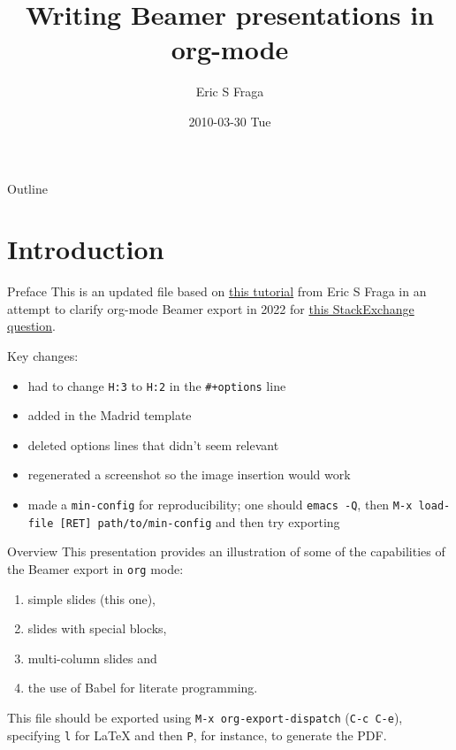 \documentclass[bigger]{beamer}
\author{Eric S Fraga}
\date{2010-03-30 Tue}
\title{Writing Beamer presentations in org-mode}
\begin{document}
\maketitle
\begin{frame}{Outline}
\tableofcontents
\end{frame}



\section{Introduction}
\label{sec:org5c56c10}
\begin{frame}[label={sec:orgdc24886},fragile]{Preface}
 This is an updated file based on \href{https://orgmode.org/worg/exporters/beamer/tutorial.html}{this tutorial} from Eric S Fraga in an attempt to clarify
org-mode Beamer export in 2022 for \href{https://stackoverflow.com/questions/6691588/emacs-org-beamer-no-definition-for-class-beamer-in-org-export-latex-class/7972859}{this StackExchange question}.

Key changes:
\begin{itemize}
\item had to change \texttt{H:3} to \texttt{H:2} in the \texttt{\#+options} line
\item added in the Madrid template
\item deleted options lines that didn't seem relevant
\item regenerated a screenshot so the image insertion would work
\item made a \texttt{min-config} for reproducibility; one should \texttt{emacs -Q}, then \texttt{M-x load-file
  [RET] path/to/min-config} and then try exporting
\end{itemize}
\end{frame}

\begin{frame}[label={sec:org9d87f98},fragile]{Overview}
 This presentation provides an illustration of some of the capabilities of the \alert{Beamer} export in \texttt{org} mode:

\begin{enumerate}
\item simple slides (this one),
\item slides with special blocks,
\item multi-column slides and
\item the use of \alert{Babel} for literate programming.
\end{enumerate}

This file should be exported using \texttt{M-x org-export-dispatch} (\texttt{C-c C-e}), specifying \texttt{l} for \LaTeX{} and then \texttt{P}, for instance, to generate the PDF.
\end{frame}
\end{document}
